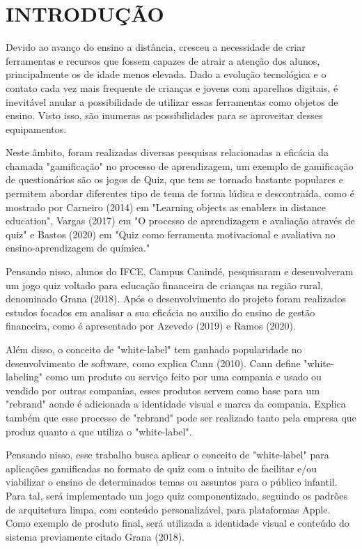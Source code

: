 \chapter{INTRODUÇÃO}
\thispagestyle{empty}

Devido ao avanço do ensino a distância, cresceu a necessidade de criar ferramentas e recursos que fossem capazes de atrair a atenção dos alunos, principalmente os de idade menos elevada. Dado a evolução tecnológica e o contato cada vez mais frequente de crianças e jovens com aparelhos digitais, é inevitável anular a possibilidade de utilizar essas ferramentas como objetos de ensino. Visto isso, são inumeras as possibilidades para se aproveitar desses equipamentos.

Neste âmbito, foram realizadas diversas pesquisas relacionadas a eficácia da chamada "gamificação" no processo de aprendizagem, um exemplo de gamificação de questionários são os jogos de Quiz, que tem se tornado bastante populares e permitem abordar diferentes tipo de tema de forma lúdica e descontraída, como é mostrado por Carneiro (2014) em "Learning objects as enablers in distance education"\nocite{carneiro2014learning}, Vargas (2017) em "O processo de aprendizagem e avaliação através de
quiz"\nocite{vargas2017processo} e Bastos (2020) em "Quiz como ferramenta motivacional e avaliativa no ensino-aprendizagem de química."\nocite{bastos2020quiz}

Pensando nisso, alunos do IFCE, Campus Canindé, pesquisaram e desenvolveram um jogo quiz voltado para educação financeira de crianças na região rural, denominado Grana (2018)\nocite{pereira2018grana}. Após o desenvolvimento do projeto foram realizados estudos focados em analisar a sua eficácia no auxilio do ensino de gestão financeira, como é apresentado por Azevedo (2019)\nocite{azevedo2019analise} e Ramos (2020)\nocite{ramos2020analise}.

Além disso, o conceito de "white-label" tem ganhado popularidade no desenvolvimento de software, como explica Cann (2010). Cann define "white-labeling" como um produto ou serviço feito por uma compania e usado ou vendido por outras companias, esses produtos servem como base para um "rebrand" aonde é adicionada a identidade visual e marca da compania. Explica também que esse processo de "rebrand" pode ser realizado tanto pela empresa que produz quanto a que utiliza o "white-label".

Pensando nisso, esse trabalho busca aplicar o conceito de "white-label" para aplicações gamificadas no formato de quiz com o intuito de facilitar e/ou viabilizar o ensino de determinados temas ou assuntos para o público infantil. Para tal, será implementado um jogo quiz componentizado, seguindo os padrões de arquitetura limpa, com conteúdo personalizável, para plataformas Apple. Como exemplo de produto final, será utilizada a identidade visual e conteúdo do sistema previamente citado Grana (2018).